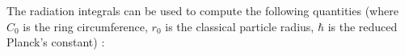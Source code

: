 The radiation integrals can be used to compute the following quantities
  (where
   $C_0$ is the ring circumference, $r_0$ is the classical particle radius, $\hbar$ is the reduced Planck's constant)
:

